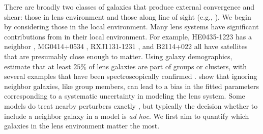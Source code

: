 There are broadly two classes of galaxies that produce external convergence and shear: those in lens environment and those along line of sight (e.g., \citealt{Jaroszynski14,Seljak94,Bar-Kana96,Keeton97}). We begin by considering those in the local environment. Many lens systems have significant contributions from in their local environment. For example, HE0435-1223 has a neighbor \citep{Kochanek06}, MG0414+0534 \citep{Tonry99}, RXJ1131-1231 \citep{Sluse03}, and B2114+022 \citep{King99} all have satellites that are presumably close enough to matter. Using galaxy demographics, \citet{Keeton00} estimate that at least $25\%$ of lens galaxies are part of groups or clusters, with several examples that have been spectroscopically confirmed \citep[][and references therein]{Momcheva06}. \citet{Keeton04} show that ignoring neighbor galaxies, like group members, can lead to a bias in the fitted  parameters corresponding to a systematic uncertainty in modeling the lens system. Some models do treat nearby perturbers exactly \citep[e.g.][]{Fadely12}, but typically the decision whether to include a neighbor galaxy in a model is \textit{ad hoc}. We first aim to quantify which galaxies in the lens environment matter the most.
